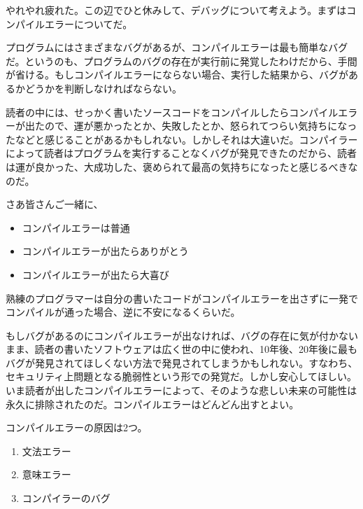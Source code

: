 
やれやれ疲れた。この辺でひと休みして、デバッグについて考えよう。まずはコンパイルエラーについてだ。

プログラムにはさまざまなバグがあるが、コンパイルエラーは最も簡単なバグだ。というのも、プログラムのバグの存在が実行前に発覚したわけだから、手間が省ける。もしコンパイルエラーにならない場合、実行した結果から、バグがあるかどうかを判断しなければならない。

読者の中には、せっかく書いたソースコードをコンパイルしたらコンパイルエラーが出たので、運が悪かったとか、失敗したとか、怒られてつらい気持ちになったなどと感じることがあるかもしれない。しかしそれは大違いだ。コンパイラーによって読者はプログラムを実行することなくバグが発見できたのだから、読者は運が良かった、大成功した、褒められて最高の気持ちになったと感じるべきなのだ。

さあ皆さんご一緒に、

\begin{itemize}
\item
  コンパイルエラーは普通
\item
  コンパイルエラーが出たらありがとう
\item
  コンパイルエラーが出たら大喜び
\end{itemize}

熟練のプログラマーは自分の書いたコードがコンパイルエラーを出さずに一発でコンパイルが通った場合、逆に不安になるくらいだ。

もしバグがあるのにコンパイルエラーが出なければ、バグの存在に気が付かないまま、読者の書いたソフトウェアは広く世の中に使われ、10年後、20年後に最もバグが発見されてほしくない方法で発見されてしまうかもしれない。すなわち、セキュリティ上問題となる脆弱性という形での発覚だ。しかし安心してほしい。いま読者が出したコンパイルエラーによって、そのような悲しい未来の可能性は永久に排除されたのだ。コンパイルエラーはどんどん出すとよい。

コンパイルエラーの原因は2つ。

\begin{enumerate}
\def\labelenumi{\arabic{enumi}.}
\item
  文法エラー
\item
  意味エラー
\item
  コンパイラーのバグ
\end{enumerate}

